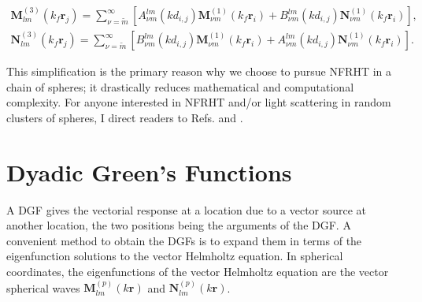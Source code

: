 %
\begin{subequations}
\begin{align}
\boldsymbol{M}_{lm}^{(3)}(k_{f}\boldsymbol{r}_{j}) = \sum_{\nu = \widetilde{m}}^{\infty} \left[ A_{\nu m}^{lm}(k d_{i,j}) \boldsymbol{M}_{\nu m}^{(1)}(k_{f}\boldsymbol{r}_{i}) + B_{\nu m}^{lm}(k d_{i,j}) \boldsymbol{N}_{\nu m}^{(1)}(k_{f}\boldsymbol{r}_{i}) \right],
\\
\boldsymbol{N}_{lm}^{(3)}(k_{f}\boldsymbol{r}_{j}) = \sum_{\nu = \widetilde{m}}^{\infty} \left[ B_{\nu m}^{lm}(k d_{i,j}) \boldsymbol{M}_{\nu m}^{(1)}(k_{f}\boldsymbol{r}_{i}) + A_{\nu m}^{lm}(k d_{i,j}) \boldsymbol{N}_{\nu m}^{(1)}(k_{f}\boldsymbol{r}_{i}) \right].
\end{align}
\end{subequations}

This simplification is the primary reason why we choose to pursue NFRHT in a chain of spheres; it drastically reduces mathematical and computational complexity. For anyone interested in NFRHT and/or light scattering in random clusters of spheres, I direct readers to Refs.  and .


\section{Dyadic Green's Functions}
%
A DGF gives the vectorial response at a location due to a vector source at another location, the two positions being the arguments of the DGF. A convenient method to obtain the DGFs is to expand them in terms of the eigenfunction solutions to the vector Helmholtz equation. In spherical coordinates, the eigenfunctions of the vector Helmholtz equation are the vector spherical waves $\boldsymbol{M}_{l m}^{(p)}(k \boldsymbol{r})$  and $\boldsymbol{N}_{l m}^{(p)}(k \boldsymbol{r})$.

